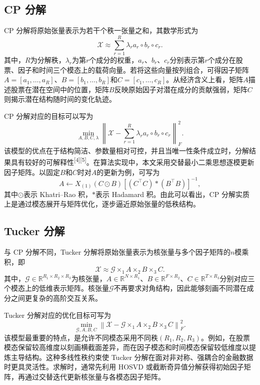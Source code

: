 \subsection{CP 分解}

CP 分解将原始张量表示为若干个秩一张量之和，其数学形式为
\begin{equation}
\mathcal{X}\approx \sum_{r=1}^{R}\lambda_r a_r\circ b_r\circ c_r.
\end{equation}
其中，$R$为分解秩，$\lambda_r$为第$r$个成分的权重，$a_r$、$b_r$、$c_r$分别表示第$r$个成分在股票、因子和时间三个模态上的载荷向量。若将这些向量按列组合，可得因子矩阵$A=[a_1,\ldots,a_R]$、$B=[b_1,\ldots,b_R]$和$C=[c_1,\ldots,c_R]$。从经济含义上看，矩阵$A$描述股票在潜在空间中的位置，矩阵$B$反映原始因子对潜在成分的贡献强弱，矩阵$C$则揭示潜在结构随时间的变化轨迹。

CP 分解对应的目标可以写为
\begin{equation}
\min_{A,B,C,\lambda}\left\|\mathcal{X}-\sum_{r=1}^{R}\lambda_r a_r\circ b_r\circ c_r\right\|_F^2.
\end{equation}
该模型的优点在于结构简洁、参数量相对可控，并且当唯一性条件成立时，分解结果具有较好的可解释性\textsuperscript{[4][5]}。在算法实现中，本文采用交替最小二乘思想逐模更新因子矩阵。以固定$B$和$C$时对$A$的更新为例，可写为
\begin{equation}
A\leftarrow X_{(1)}(C\odot B)\left[(C^{\top}C)\ast(B^{\top}B)\right]^{-1},
\end{equation}
其中$\odot$表示 Khatri--Rao 积，$\ast$表示 Hadamard 积。由此可以看出，CP 分解实质上是通过模态展开与矩阵优化，逐步逼近原始张量的低秩结构。

\subsection{Tucker 分解}

与 CP 分解不同，Tucker 分解将原始张量表示为核张量与多个因子矩阵的$n$模乘积，即
\begin{equation}
\mathcal{X}\approx \mathcal{G}\times_1 A\times_2 B\times_3 C.
\end{equation}
其中，$\mathcal{G}\in\mathbb{R}^{R_1\times R_2\times R_3}$为核张量，$A\in\mathbb{R}^{N\times R_1}$、$B\in\mathbb{R}^{F\times R_2}$、$C\in\mathbb{R}^{T\times R_3}$分别对应三个模态上的低维表示矩阵。核张量$\mathcal{G}$不再要求对角结构，因此能够刻画不同潜在成分之间更复杂的高阶交互关系。

Tucker 分解对应的优化目标可写为
\begin{equation}
\min_{\mathcal{G},A,B,C}\left\|\mathcal{X}-\mathcal{G}\times_1 A\times_2 B\times_3 C\right\|_F^2.
\end{equation}
该模型最重要的特点，是允许不同模态采用不同秩$(R_1,R_2,R_3)$。例如，在股票模态保留较高维度以刻画横截面差异，而在因子模态和时间模态保留较低维度以提炼主导结构。这种多线性秩约束使 Tucker 分解在面对非对称、强耦合的金融数据时更具灵活性。求解时，通常先利用 HOSVD 或截断奇异值分解获得初始因子矩阵，再通过交替迭代更新核张量与各模态因子矩阵。

